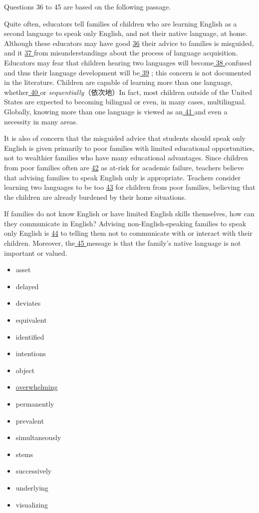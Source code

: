 \documentclass[UTF8,11pt]{ctexart}
\begin{document}
Questions 36 to 45 are based on the following passage.


Quite often, educators tell families of children who are learning English as a second language to speak only English, and not their native language, at home. Although these educators may have good \uline{36} their advice to families is misguided, and it \uline{37 }from misunderstandings about the process of language acquisition. Educators may fear that children hearing two languages will become\uline{ 38 }confused and thus their language development will be\uline{ 39} ; this concern is not documented in the literature. Children are capable of learning more than one language, whether\uline{ 40 }or\textit{ sequentially}（依次地）In fact, most children outside of the United States are expected to becoming bilingual or even, in many cases, multilingual. Globally, knowing more than one language is viewed as an\uline{ 41 }and even a necessity in many areas.


It is also of concern that the misguided advice that students should speak only English is given primarily to poor families with limited educational opportunities, not to wealthier families who have many educational advantages. Since children from poor families often are \uline{42} as at-risk for academic failure, teachers believe that advising families to speak English only is appropriate. Teachers consider learning two languages to be too \uline{43} for children from poor families, believing that the children are already burdened by their home situations.


If families do not know English or have limited English skills themselves, how can they communicate in English? Advising non-English-speaking families to speak only English is \uline{44} to telling them not to communicate with or interact with their children. Moreover, the\uline{ 45 }message is that the family’s native language is not important or valued.


\begin{itemize}[leftmargin=2em,itemsep=.2em,topsep=.4em]\item[A.] asset
\item[B.] delayed
\item[C.] deviates
\item[D.] equivalent
\item[E.] identified
\item[F.] intentions
\item[G.] object
\item[H.] \uline{overwhelming}
\item[I.] permanently
\item[J.] prevalent
\item[K.] simultaneously
\item[L.] stems
\item[M.] successively
\item[N.] underlying
\item[O.] visualizing
\end{itemize}
\end{document}
